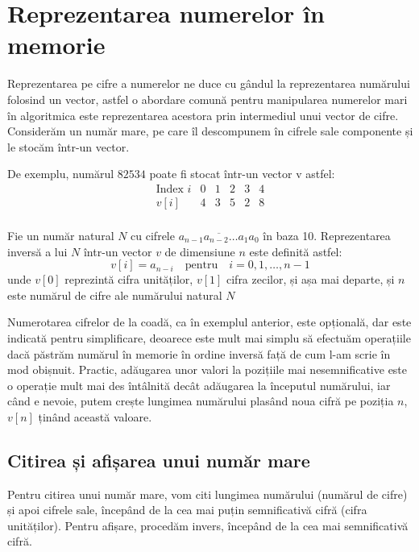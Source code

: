 \section{Reprezentarea numerelor în memorie}

Reprezentarea pe cifre a numerelor ne duce cu gândul la reprezentarea numărului folosind un vector, astfel o abordare comună pentru manipularea numerelor mari în algoritmica este reprezentarea acestora prin intermediul unui vector de cifre. Considerăm un număr mare, pe care îl descompunem în cifrele sale componente și le stocăm într-un vector.

De exemplu, numărul $82534$ poate fi stocat într-un vector v astfel:
\[
\begin{array}{r|cccccccc}
\text{Index } i & 0 & 1 & 2 & 3 & 4\\
\hline
v[i] & 4 & 3 & 5 & 2 & 8 \\
\end{array}
\]
\begin{definition}\label{def:reprezenatarea_inversa}
Fie un număr natural \( N \) cu cifrele \( \overline{a_{n-1} a_{n-2} \ldots a_1 a_0} \) în baza 10. Reprezentarea inversă a lui \( N \) într-un vector \( v \) de dimensiune \( n \) este definită astfel:
\[ v[i] = a_{n-i} \quad \text{pentru} \quad i = 0, 1, \ldots, n-1 \]
unde \( v[0] \) reprezintă cifra unităților, \( v[1] \) cifra zecilor, și așa mai departe, și \(n\) este numărul de cifre ale numărului natural \(N\)
\end{definition}

\begin{observation}
    Numerotarea cifrelor de la coadă, ca în exemplul anterior, este opțională, dar este indicată pentru simplificare, deoarece este mult mai simplu să efectuăm operațiile dacă păstrăm numărul în memorie în ordine inversă față de cum l-am scrie în mod obișnuit. Practic, adăugarea unor valori la pozițiile mai nesemnificative este o operație mult mai des întâlnită decât adăugarea la începutul numărului, iar când e nevoie, putem crește lungimea numărului plasând noua cifră pe poziția $n$, $v[n]$ ținând această valoare.
\end{observation}
\subsection{Citirea și afișarea unui număr mare}
Pentru citirea unui număr mare, vom citi lungimea numărului (numărul de cifre) și apoi cifrele sale, începând de la cea mai puțin semnificativă cifră (cifra unităților). Pentru afișare, procedăm invers, începând de la cea mai semnificativă cifră.

